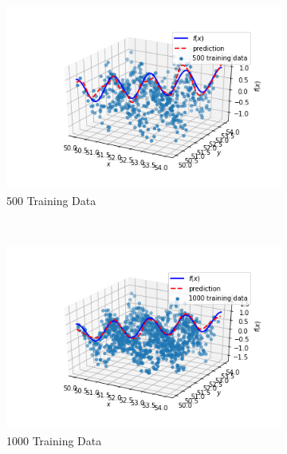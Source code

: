 \documentclass{article}
\begin{document}
\begin{figure}[htbp]
\center
    \begin{subfigure}{0.45\textwidth}
        \includegraphics[width=\textwidth]{figures/500TrainingData}
        \caption{500 Training Data}
    \end{subfigure}
    ~ %
    \begin{subfigure}{0.45\textwidth}
        \includegraphics[width=\textwidth]{figures/1000TrainingData}
        \caption{1000 Training Data}
    \end{subfigure}
        ~ %
    \begin{subfigure}{0.45\textwidth}

\end{subfigure}
\end{figure}
\end{document}
